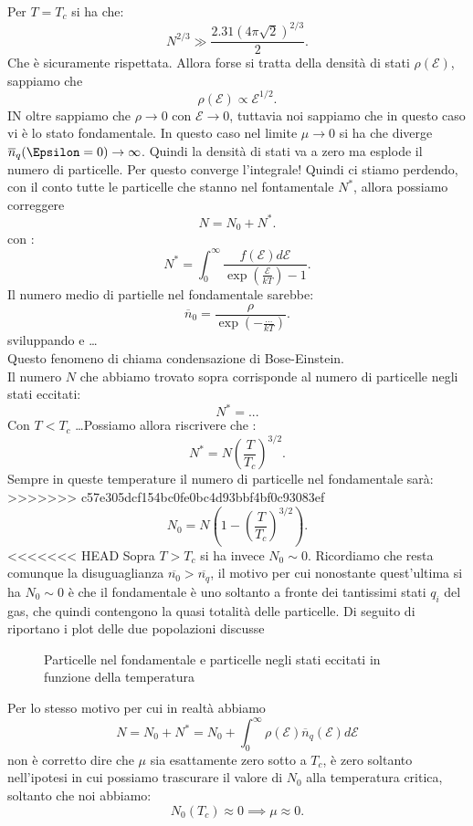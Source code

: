 Per $T = T_{c}$ si ha che:
\[
	N^{2 /3} \gg \frac{2.31 \left( 4\pi\sqrt{2}  \right)^{2 /3}}{2}
.\] 
Che è sicuramente rispettata. Allora forse si tratta della densità di stati $\rho ( \mathcal{E} ) $, sappiamo che 
\[
	\rho ( \mathcal{E} ) \propto \mathcal{E} ^{1 /2}
.\] 
IN oltre sappiamo che $\rho \to 0$ con $\mathcal{E} \to 0$, tuttavia noi sappiamo che in questo caso vi è lo stato fondamentale. In questo caso nel limite $\mu \to 0$ si ha che diverge $\overline{n}_{q}( \Epsilon = 0 ) \to \infty$. Quindi la densità di stati va a zero ma esplode il numero di particelle. Per questo converge l'integrale! Quindi ci stiamo perdendo, con il conto tutte le particelle che stanno nel fontamentale $N^{*}$, allora  possiamo correggere 
\[
	N = N_0 + N^{*}
.\] 
con :
\[
	N^{*} = \int_{0}^{\infty} \frac{f( \mathcal{E} ) d\mathcal{E} }{\exp\left( \frac{\mathcal{E} }{kT} \right) -1} 
.\] 
Il numero medio di partielle nel fondamentale sarebbe:
\[
	\overline{n}_{0} = \frac{\rho }{\exp\left( -\frac{\ldots}{kT} \right) }
.\] sviluppando e \ldots\\
Questo fenomeno di chiama condensazione di Bose-Einstein.\\
Il numero $N$ che abbiamo trovato sopra corrisponde al numero di particelle negli stati eccitati:
\[
	N^{*} =.. 
.\] 
Con $T< T_{c}$ \ldots Possiamo allora riscrivere che :
\[
	N^{*} = N \left( \frac{T}{T_{c}} \right)^{3 /2}
.\] 
Sempre in queste temperature il numero di particelle nel fondamentale sarà:
>>>>>>> c57e305dcf154bc0fe0bc4d93bbf4bf0c93083ef
\[
	N_0 = N\left( 1 -\left( \frac{T}{T_{c}} \right)^{3 /2}
 \right) 
.\] 
<<<<<<< HEAD
Sopra $T>T_{c}$ si ha invece $N_0 \sim 0$. Ricordiamo che resta comunque la disuguaglianza $\overline{n_0}>\overline{n_{q}}$, il motivo per cui nonostante quest'ultima si ha $N_0 \sim 0$ è che il fondamentale è uno soltanto a fronte dei tantissimi stati $q_{i}$ del gas, che quindi contengono la quasi totalità delle particelle. Di seguito di riportano i plot delle due popolazioni discusse
\begin{figure}[H]
    \centering
    \caption{Particelle nel fondamentale e particelle negli stati eccitati in funzione della temperatura}
    \label{fig:particelle-nel-fondamentale-e-particelle-negli-stati-eccitati-in-funzione-della-temperatura}
\end{figure}
\noindent
Per lo stesso motivo per cui in realtà abbiamo 
\[
	N = N_0 + N^{*}= N_0 + 
	\int_{0}^{\infty} 
	\rho ( \mathcal{E} )\overline{n}_{q}( \mathcal{E} ) 
	d\mathcal{E} 
\]
non è corretto dire che $\mu $ sia esattamente zero sotto a $T_{c}$, è zero soltanto nell'ipotesi in cui possiamo trascurare il valore di $N_0$ alla temperatura critica, soltanto che noi abbiamo:
\[
	N_0( T_{c}) \approx 0 \implies \mu \approx 0
.\] 

